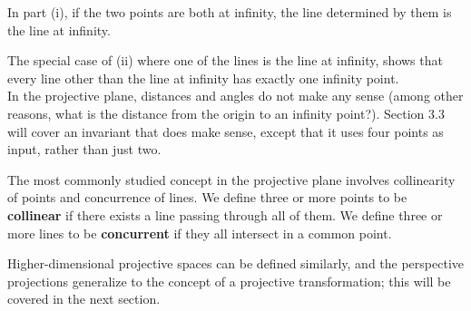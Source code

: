 \documentclass[leqno]{book}
\begin{document}
In part (i), if the two points are both at infinity, the line determined by them is the line at infinity.

The special case of (ii) where one of the lines is the line at infinity, shows that every line other than the line at infinity has exactly one infinity point.\\

\noindent In the projective plane, distances and angles do not make any sense (among other reasons, what is the distance from the origin to an infinity point?).  Section 3.3 will cover an invariant that does make sense, except that it uses four points as input, rather than just two.

The most commonly studied concept in the projective plane involves collinearity of points and concurrence of lines.  We define three or more points to be \textbf{collinear} if there exists a line passing through all of them.  We define three or more lines to be \textbf{concurrent} if they all intersect in a common point.

Higher-dimensional projective spaces can be defined similarly, and the perspective projections generalize to the concept of a projective transformation; this will be covered in the next section.
\end{document}
